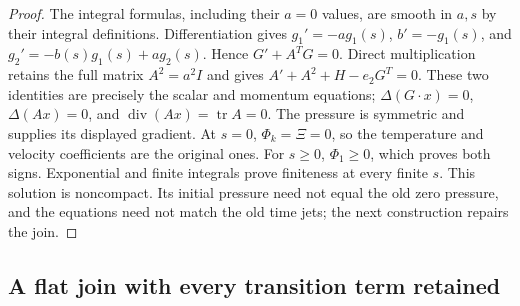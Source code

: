 \begin{proof}
The integral formulas, including their $a=0$ values, are smooth
in $a,s$ by their integral definitions.  Differentiation gives
$g_1'=-ag_1(s)$, $b'=-g_1(s)$, and
$g_2'=-b(s)g_1(s)+ag_2(s)$.  Hence
$G'+A^TG=0$.  Direct multiplication retains the full matrix
$A^2=a^2I$ and gives
$A'+A^2+H-e_2G^T=0$.
These two identities are precisely the scalar and momentum
equations; $\Delta(G\cdot x)=0$, $\Delta(Ax)=0$, and
$\operatorname{div}(Ax)=\operatorname{tr}A=0$.
The pressure is symmetric and supplies its displayed gradient.
At $s=0$, $\Phi_k=\Xi=0$, so the temperature and velocity
coefficients are the original ones.  For $s\geq0$,
$\Phi_1\geq0$, which proves both signs.
Exponential and finite integrals prove finiteness at every finite
$s$.  This solution is noncompact.  Its initial pressure need
not equal the old zero pressure, and the equations need not
match the old time jets; the next construction repairs the join.
\end{proof}

\subsection{A flat join with every transition term retained}

